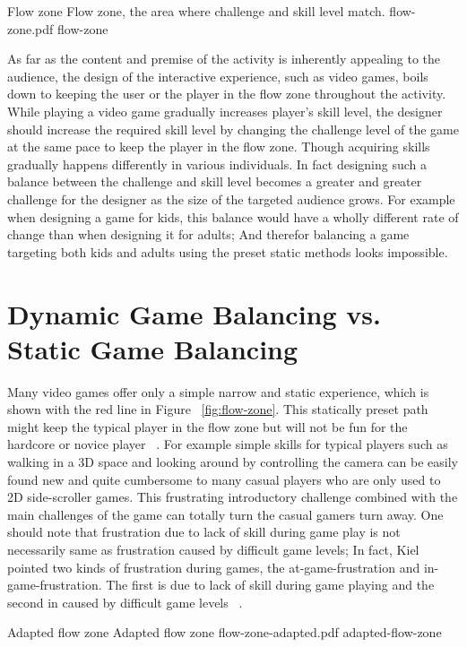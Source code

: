 \img
{Flow zone}
{Flow zone, the area where challenge and skill level match.}
{flow-zone.pdf}
{flow-zone}

As far as the content and premise of the activity is inherently appealing to the audience, the design of the interactive experience, such as video games, boils down to keeping the user or the player in the flow zone throughout the activity. While playing a video game gradually increases player's skill level, the designer should increase the required skill level by changing the challenge level of the game at the same pace to keep the player in the flow zone. Though acquiring skills gradually happens differently in various individuals. In fact designing such a balance between the challenge and skill level becomes a greater and greater challenge for the designer as the size of the targeted audience grows. For example when designing a game for kids, this balance would have a wholly different rate of change than when designing it for adults; And therefor balancing a game targeting both kids and adults using the preset static methods looks impossible.

\section{Dynamic Game Balancing vs. Static Game Balancing }

Many video games offer only a simple narrow and static experience, which is shown with the red line in Figure ~\ref{fig:flow-zone}. This statically preset path might keep the typical player in the flow zone but will not be fun for the hardcore or novice player ~\cite{chen2007flow}. For example simple skills for typical players such as walking in a 3D space and looking around by controlling the camera can be easily found new and quite cumbersome to many casual players who are only used to 2D side-scroller games. This frustrating introductory challenge combined with the main challenges of the game can totally turn the casual gamers turn away. One should note that frustration due to lack of skill during game play is not necessarily same as frustration caused by difficult game levels; In fact, Kiel pointed two kinds of frustration during games, the at-game-frustration and in-game-frustration. The first is due to lack of skill during game playing and the second in caused by difficult game levels ~\cite{gilleade2004using}.

\img
{Adapted flow zone}
{Adapted flow zone}
{flow-zone-adapted.pdf}
{adapted-flow-zone}

